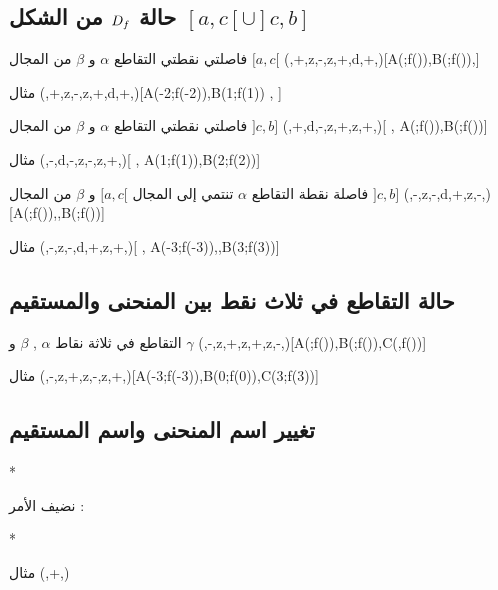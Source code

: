 \documentclass[12pt,a4paper]{article}
\begin{document}
\subsection{حالة $D\sb{f}$ من الشكل $[a,c[\cup ]c,b]$}
\begin{myboxe}{فاصلتي نقطتي التقاطع 
$\alpha$
و
$\beta$
من المجال
$[a,c[$}
(,+,z,-,z,+,d,+,)[A(\alpha;f(\alpha)),B(\beta;f(\beta)),]
\end{myboxe}
%
\begin{boxe}{مثال }
\posaw[-3,-2,1,2,3](,+,z,-,z,+,d,+,)[A(-2;f(-2)),B(1;f(1)) , ]
\end{boxe}
%
\begin{myboxe}{فاصلتي نقطتي التقاطع 
$\alpha$
و
$\beta$
من المجال
$]c,b]$}
(,+,d,-,z,+,z,+,)[ , A(\alpha;f(\alpha)),B(\beta;f(\beta))]
\end{myboxe}
%
\begin{boxe}{مثال }
\posaw[-3,-2,1,2,3](,-,d,-,z,-,z,+,)[ , A(1;f(1)),B(2;f(2))]
\end{boxe}
%
\begin{myboxe}{فاصلة نقطة التقاطع  
$\alpha$
تنتمي إلى المجال
$[a,c[$
و
$\beta$
من المجال
$]c,b]$}
(,-,z,-,d,+,z,-,)[A(\alpha;f(\alpha)),,B(\beta;f(\beta))]
\end{myboxe}
%
\begin{boxe}{مثال }
\posaw[-5,-3,0,3,5](,-,z,-,d,+,z,+,)[ , A(-3;f(-3)),,B(3;f(3))]
\end{boxe}
\subsection{حالة التقاطع في ثلاث نقط بين المنحنى والمستقيم}
\begin{myboxe}{التقاطع في ثلاثة نقاط
$\alpha$ , $\beta$ و
$\gamma$}
(,-,z,+,z,+,z,-,)[A(\alpha;f(\alpha)),B(\beta;f(\beta)),C(\gamma,f(\gamma))]
\end{myboxe}
%
\begin{boxe}{مثال }
\posaw[-5,-3,0,3,5](,-,z,+,z,-,z,+,)[A(-3;f(-3)),B(0;f(0)),C(3;f(3))]
\end{boxe}
\subsection{تغيير اسم المنحنى واسم المستقيم}
\begin{boxlis}
*\begin{flushright}
\textarabic{نضيف الأمر :
 }
\end{flushright}*
\def\Nplot{*\textarabic{اسم المنحنى
 }*}
\def\Nline{*\textarabic{إسم المستقيم
 }*}
\end{boxlis}
\begin{boxe}{مثال }
\def\Nplot{C\sb{\ell}}
\def\Nline{T}
\posba[1,2](,+,)
\end{boxe}
\end{document}
